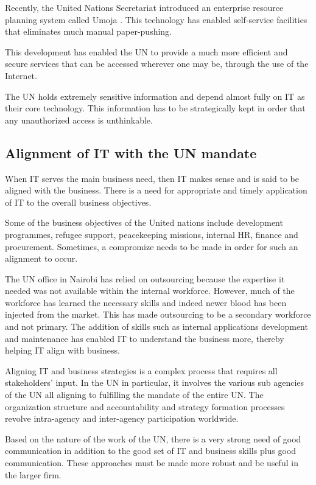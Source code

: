 \documentclass[12pt]{article}
\begin{document}
Recently, the United Nations Secretariat introduced an enterprise resource planning system called Umoja \cite{umoja}. This technology has enabled self-service facilities that eliminates much manual paper-pushing.

This development has enabled the UN to provide a much more efficient and secure services that can be accessed wherever one may be, through the use of the Internet. 

The UN holds extremely sensitive information and depend almost fully on IT as their core technology.  This information has to be strategically kept in order that any unauthorized access is unthinkable.

\subsection*{Alignment of IT with the UN mandate}
When IT serves the main business need, then IT makes sense and is said to be aligned with the business. There is a need for appropriate and timely application of IT to the overall business objectives. 

Some of the business objectives of the United nations include development programmes, refugee support, peacekeeping missions, internal HR, finance and procurement. Sometimes, a compromize needs to be made in order for such an alignment to occur.


The UN office in Nairobi has relied on outsourcing because the expertise it needed was not available within the internal workforce. However, much of the workforce has learned the necessary skills and indeed newer blood has been injected from the market. This has made outsourcing to be a secondary workforce and not primary. The addition of skills such as internal applications development and maintenance has enabled IT to understand the business more, thereby helping IT align with business.

Aligning IT and business strategies is a complex process that requires all stakeholders' input. In the UN in particular, it involves the various sub agencies of the UN all aligning to fulfilling the mandate of the entire UN. The organization structure and accountability and strategy formation processes revolve intra-agency and inter-agency participation worldwide.

Based on the nature of the work of the UN, there is a very strong need of good communication in addition to the good set of IT and business skills plus good communication. These approaches must be made more robust and be useful in the larger firm.
\end{document}
